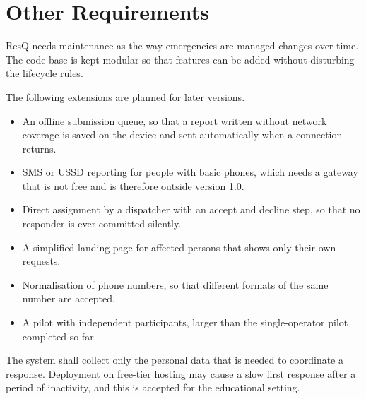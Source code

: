 \documentclass{scrreprt}
\newcounter{fr}
\begin{document}
\chapter{Other Requirements}
ResQ needs maintenance as the way emergencies are managed changes over time. The code base is kept modular so that features can be added without disturbing the lifecycle rules.

The following extensions are planned for later versions.
\begin{itemize}
    \item An offline submission queue, so that a report written without network coverage is saved on the device and sent automatically when a connection returns.
    \item SMS or USSD reporting for people with basic phones, which needs a gateway that is not free and is therefore outside version 1.0.
    \item Direct assignment by a dispatcher with an accept and decline step, so that no responder is ever committed silently.
    \item A simplified landing page for affected persons that shows only their own requests.
    \item Normalisation of phone numbers, so that different formats of the same number are accepted.
    \item A pilot with independent participants, larger than the single-operator pilot completed so far.
\end{itemize}
The system shall collect only the personal data that is needed to coordinate a response. Deployment on free-tier hosting may cause a slow first response after a period of inactivity, and this is accepted for the educational setting.
\end{document}

